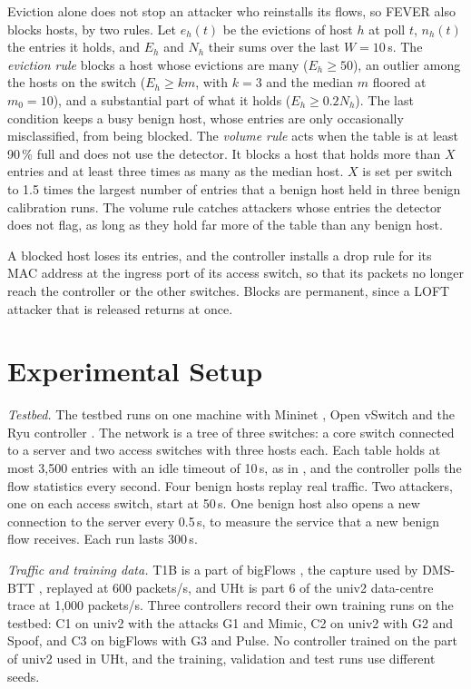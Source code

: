 \documentclass[conference]{IEEEtran}
\begin{document}
Eviction alone does not stop an attacker who reinstalls its flows, so FEVER also blocks hosts, by two
rules. Let $e_h(t)$ be the evictions of host $h$ at poll $t$, $n_h(t)$ the entries it holds, and $E_h$
and $N_h$ their sums over the last $W = 10$\,s. The \textit{eviction rule} blocks a host whose
evictions are many ($E_h \ge 50$), an outlier among the hosts on the switch ($E_h \ge k m$, with $k = 3$
and the median $m$ floored at $m_0 = 10$), and a substantial part of what it holds
($E_h \ge 0.2 N_h$). The last condition keeps a busy benign host, whose entries are only occasionally
misclassified, from being blocked. The \textit{volume rule} acts when the table is at least 90\,\% full
and does not use the detector. It blocks a host that holds more than $X$ entries and at least three times
as many as the median host. $X$ is set per switch to 1.5 times the largest number of entries that a
benign host held in three benign calibration runs. The volume rule catches attackers whose entries the
detector does not flag, as long as they hold far more of the table than any benign host.

A blocked host loses its entries, and the controller installs a drop rule for its MAC address at the
ingress port of its access switch, so that its packets no longer reach the controller or the other
switches. Blocks are permanent, since a LOFT attacker that is released returns at once.

\section{Experimental Setup}
\label{sec:setup}

\textit{Testbed.} The testbed runs on one machine with Mininet \cite{lantz2010mininet}, Open vSwitch
\cite{pfaff2015ovs} and the Ryu controller \cite{ryu}. The network is a tree of three switches: a core
switch connected to a server and two access switches with three hosts each. Each table holds at most
3,500 entries with an idle timeout of 10\,s, as in \cite{tang2024ftodefender,tang2024ftop,tang2025dmsbtt},
and the controller polls the flow statistics every second. Four benign hosts replay real traffic. Two
attackers, one on each access switch, start at 50\,s. One benign host also opens a new connection to the
server every 0.5\,s, to measure the service that a new benign flow receives. Each run lasts 300\,s.

\textit{Traffic and training data.} T1B is a part of bigFlows \cite{bigflows}, the capture used by
DMS-BTT \cite{tang2025dmsbtt}, replayed at 600 packets/s, and UHt is part 6 of the univ2 data-centre
trace \cite{benson2010imc} at 1,000 packets/s. Three controllers record their own training runs on the
testbed: C1 on univ2 with the attacks G1 and Mimic, C2 on univ2 with G2 and Spoof, and C3 on bigFlows
with G3 and Pulse. No controller trained on the part of univ2 used in UHt, and the training, validation
and test runs use different seeds.
\end{document}
